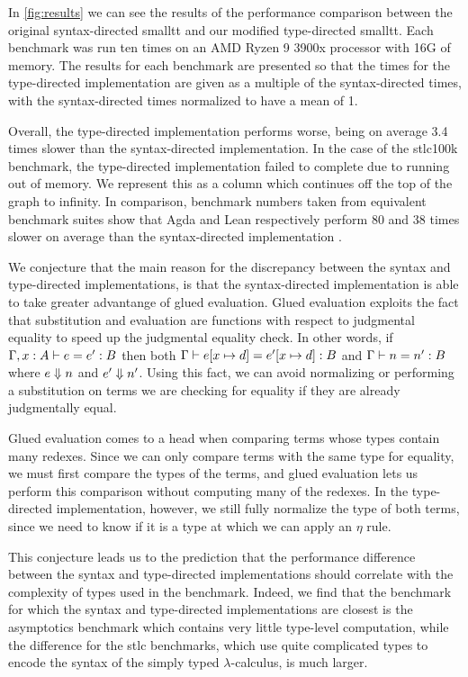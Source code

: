 In \autoref{fig:results} we can see the results of the performance comparison between the original syntax-directed smalltt and our modified type-directed smalltt.
Each benchmark was run ten times on an AMD Ryzen 9 3900x processor with 16G of memory.
The results for each benchmark are presented so that the times for the type-directed implementation are given as a multiple of the syntax-directed times, with the syntax-directed times normalized to have a mean of 1.

Overall, the type-directed implementation performs worse, being on average 3.4 times slower than the syntax-directed implementation.
In the case of the stlc100k benchmark, the type-directed implementation failed to complete due to running out of memory.
We represent this as a column which continues off the top of the graph to infinity.
In comparison, benchmark numbers taken from equivalent benchmark suites show that Agda and Lean respectively perform 80 and 38 times slower on average than the syntax-directed implementation \citep{smalltt}.

We conjecture that the main reason for the discrepancy between the syntax and type-directed implementations, is that the syntax-directed implementation is able to take greater advantange of glued evaluation.
Glued evaluation exploits the fact that substitution and evaluation are functions with respect to judgmental equality to speed up the judgmental equality check.
In other words, if $\Gamma, x : A \vdash e = e' : B$ then both $\Gamma \vdash e [x \mapsto d] = e' [x \mapsto d] : B$ and $\Gamma \vdash n = n' : B$ where $e \Downarrow n$ and $e' \Downarrow n'$.
Using this fact, we can avoid normalizing or performing a substitution on terms we are checking for equality if they are already judgmentally equal.

Glued evaluation comes to a head when comparing terms whose types contain many redexes.
Since we can only compare terms with the same type for equality, we must first compare the types of the terms, and glued evaluation lets us perform this comparison without computing many of the redexes.
In the type-directed implementation, however, we still fully normalize the type of both terms, since we need to know if it is a type at which we can apply an $\eta$ rule.

This conjecture leads us to the prediction that the performance difference between the syntax and type-directed implementations should correlate with the complexity of types used in the benchmark.
Indeed, we find that the benchmark for which the syntax and type-directed implementations are closest is the asymptotics benchmark which contains very little type-level computation, while the difference for the stlc benchmarks, which use quite complicated types to encode the syntax of the simply typed $\lambda$-calculus, is much larger.

